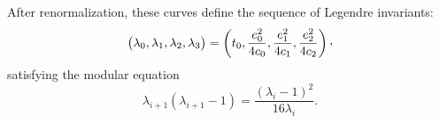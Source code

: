 \documentclass{amsart}
\newcommand{\ccomma}{\raisebox{0.4ex}{,}}
\begin{document}
After renormalization, these curves define the sequence of Legendre invariants:
$$
\big(\lambda_0,\lambda_1,\lambda_2,\lambda_3\big)
= \left(t_0, \frac{e_0^2}{4c_0}, \frac{e_1^2}{4c_1}, \frac{e_2^2}{4c_2} \right)\ccomma
$$
satisfying the modular equation
$$
\lambda_{i+1}(\lambda_{i+1} - 1) = \frac{(\lambda_i - 1)^2}{16\lambda_i}.
$$



%
\end{document}
